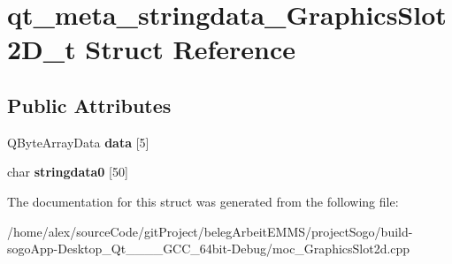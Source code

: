 \hypertarget{structqt__meta__stringdata__GraphicsSlot2D__t}{\section{qt\-\_\-meta\-\_\-stringdata\-\_\-\-Graphics\-Slot2\-D\-\_\-t Struct Reference}
\label{structqt__meta__stringdata__GraphicsSlot2D__t}
}
\subsection*{Public Attributes}
\begin{DoxyCompactItemize}
\item 
\hypertarget{structqt__meta__stringdata__GraphicsSlot2D__t_ab0dc9b502c58c53ffa92dfa1cc21f158}{Q\-Byte\-Array\-Data {\bfseries data} \mbox{[}5\mbox{]}}\label{structqt__meta__stringdata__GraphicsSlot2D__t_ab0dc9b502c58c53ffa92dfa1cc21f158}

\item 
\hypertarget{structqt__meta__stringdata__GraphicsSlot2D__t_ab73ec29b3650dfd19cd5bb35eb33a98b}{char {\bfseries stringdata0} \mbox{[}50\mbox{]}}\label{structqt__meta__stringdata__GraphicsSlot2D__t_ab73ec29b3650dfd19cd5bb35eb33a98b}

\end{DoxyCompactItemize}


The documentation for this struct was generated from the following file\-:\begin{DoxyCompactItemize}
\item 
/home/alex/source\-Code/git\-Project/beleg\-Arbeit\-E\-M\-M\-S/project\-Sogo/build-\/sogo\-App-\/\-Desktop\-\_\-\-Qt\-\_\-\_\-\_\-\_\-\-G\-C\-C\-\_\-64bit-\/\-Debug/moc\-\_\-\-Graphics\-Slot2d.\-cpp\end{DoxyCompactItemize}
